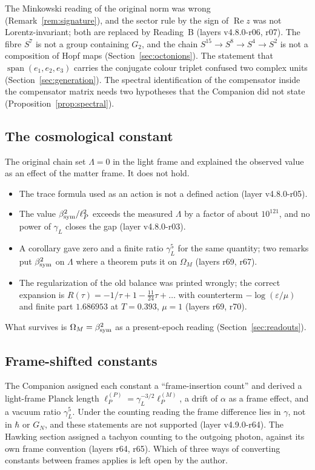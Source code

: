 The Minkowski reading of the original norm was wrong (Remark~\ref{rem:signature}), and the sector rule by the sign of
\(\operatorname{Re}z\) was not Lorentz-invariant; both are replaced by Reading~B (layers v4.8.0-r06, r07).  The fibre \(S^7\) is not a group
containing \(G_2\), and the chain \(S^{15}\to S^8\to S^4\to S^2\) is not a composition of Hopf maps (Section~\ref{sec:octonions}).  The
statement that \(\operatorname{span}(e_1,e_2,e_3)\) carries the conjugate colour triplet confused two complex units
(Section~\ref{sec:generation}).  The spectral identification of the compensator inside the compensator matrix needs two hypotheses
that the Companion did not state (Proposition~\ref{prop:spectral}).

\subsection{The cosmological constant}

The original chain set \(\Lambda=0\) in the light frame and explained the observed value as an effect of the matter frame.  It does not
hold.
\begin{itemize}
\item The trace formula used as an action is not a defined action (layer v4.8.0-r05).
\item The value \(\beta_{\rm sym}^2/\ell_P^2\) exceeds the measured \(\Lambda\) by a factor of about \(10^{121}\), and no power of \(\gamma_L\)
closes the gap (layer v4.8.0-r03).
\item A corollary gave zero and a finite ratio \(\gamma_L^5\) for the same quantity; two remarks put \(\beta_{\rm sym}^2\) on \(\Lambda\) where a
theorem puts it on \(\Omega_M\) (layers r69, r67).
\item The regularization of the old balance was printed wrongly; the correct expansion is \(R(\tau)=-1/\tau+1-\tfrac{11}{24}\tau+\dots\) with
counterterm \(-\log(\varepsilon/\mu)\) and finite part \(1.686953\) at \(T=0.393\), \(\mu=1\) (layers r69, r70).
\end{itemize}
What survives is \(\Omega_M=\beta_{\rm sym}^2\) as a present-epoch reading (Section~\ref{sec:readouts}).

\subsection{Frame-shifted constants}

The Companion assigned each constant a ``frame-insertion count'' and derived a light-frame Planck length
\(\ell_P^{(P)}=\gamma_L^{-3/2}\ell_P^{(M)}\), a drift of \(\alpha\) as a frame effect, and a vacuum ratio \(\gamma_L^5\).  Under the counting
reading the frame difference lies in \(\gamma\), not in \(\hbar\) or \(G_N\), and these statements are not supported (layer v4.9.0-r64).  The
Hawking section assigned a tachyon counting to the outgoing photon, against its own frame convention (layers r64, r65).  Which of three
ways of converting constants between frames applies is left open by the author.

